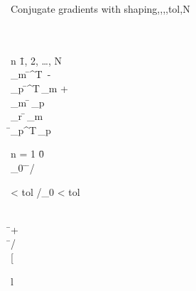 \begin{algorithm}{Conjugate gradients with shaping}{,,,\lambda,tol,N}
   \\
   \\
   \\
  \begin{FOR}{n \= 1, 2, \ldots, N} \\
    _m \= ^T\, - \lambda\, \\
    _p \= ^T\,_m + \lambda\,  \\
    _m \= \,_p \\
    _r \= \,_m \\
    \rho \= _p^T\,_p \\
    \begin{IF}{n = 1} 
      \beta \= 0 \\
      \rho_0 \= \rho
      \ELSE 
      \beta \= \rho/\hat{\rho} \\
      \begin{IF}{\beta < tol  \rho/\rho_0 < tol}
        \RETURN {}
      \end{IF} 
    \end{IF} \\
     \= 
     + \beta\,
     \\
    \alpha \= \rho/ \\
    \left[\begin{array}{l}

\end{array}
\end{FOR}
\end{algorithm}
